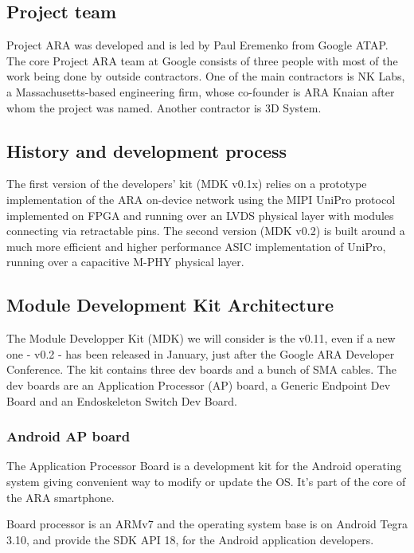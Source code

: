 \subsection{Project team}

Project ARA was developed and is led by Paul Eremenko from Google ATAP. The core Project ARA team at Google consists of three people with most of the work being done by outside contractors. One of the main contractors is NK Labs, a Massachusetts-based engineering firm, whose co-founder is ARA Knaian after whom the project was named. Another contractor is 3D System.

\subsection{History and development process}

The first version of the developers' kit (MDK v0.1x) relies on a prototype implementation of the ARA on-device network using the MIPI UniPro protocol implemented on FPGA and running over an LVDS physical layer with modules connecting via retractable pins. The second version (MDK v0.2) is built around a much more efficient and higher performance ASIC implementation of UniPro, running over a capacitive M-PHY physical layer.
         
\subsection{Module Development Kit Architecture}

The Module Developper Kit (MDK) we will consider is the v0.11, even if a new one - v0.2 - has been released in January, just after the Google ARA Developer Conference.
The kit contains three dev boards and a bunch of SMA cables. The dev boards are an Application Processor (AP) board, a Generic Endpoint Dev Board and an Endoskeleton Switch Dev Board.

\subsubsection{Android AP board}

The Application Processor Board is a development kit for the Android operating system giving convenient way to modify or update the OS. It's part of the core of the ARA smartphone.

Board processor is an ARMv7 and the operating system base is on Android Tegra 3.10, and provide the SDK API 18, for the Android application developers.

